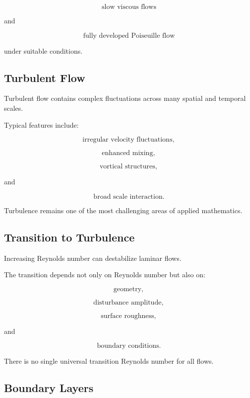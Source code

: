 \[
\boxed{
\text{slow viscous flows}
}
\]

and

\[
\boxed{
\text{fully developed Poiseuille flow}
}
\]

under suitable conditions.

\subsection{Turbulent Flow}
\label{subsec:turbulent-flow}

Turbulent flow contains complex fluctuations across many spatial and temporal
scales.

Typical features include:

\[
\boxed{
\text{irregular velocity fluctuations},
}
\]

\[
\boxed{
\text{enhanced mixing},
}
\]

\[
\boxed{
\text{vortical structures},
}
\]

and

\[
\boxed{
\text{broad scale interaction}.
}
\]

Turbulence remains one of the most challenging areas of applied mathematics.

\subsection{Transition to Turbulence}
\label{subsec:transition-to-turbulence}

Increasing Reynolds number can destabilize laminar flows.

The transition depends not only on Reynolds number but also on:

\[
\boxed{
\text{geometry},
}
\]

\[
\boxed{
\text{disturbance amplitude},
}
\]

\[
\boxed{
\text{surface roughness},
}
\]

and

\[
\boxed{
\text{boundary conditions}.
}
\]

There is no single universal transition Reynolds number for all flows.

\subsection{Boundary Layers}
\label{subsec:boundary-layers}

